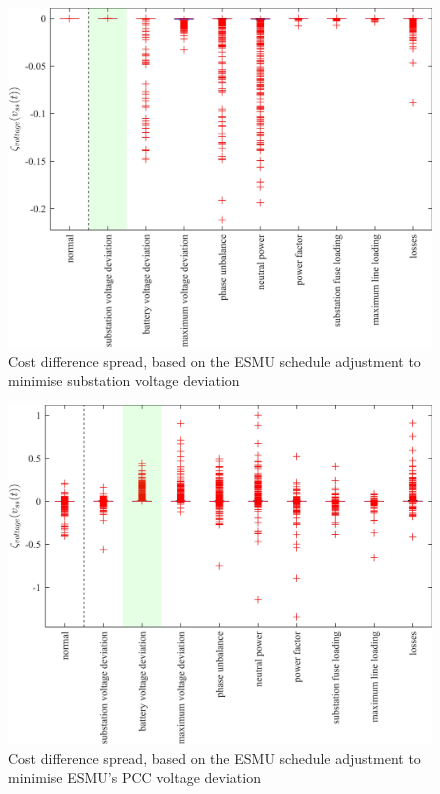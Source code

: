 \begin{figure}\centering
	\includegraphics{_chapter1/fig/appendix/minimising-substation-voltage-deviation}
	\caption{Cost difference spread, based on the ESMU schedule adjustment to minimise substation voltage deviation}
\end{figure}

\begin{figure}\centering
	\includegraphics{_chapter1/fig/appendix/minimising-battery-voltage-deviation}
	\caption{Cost difference spread, based on the ESMU schedule adjustment to minimise ESMU's PCC voltage deviation}
\end{figure}

